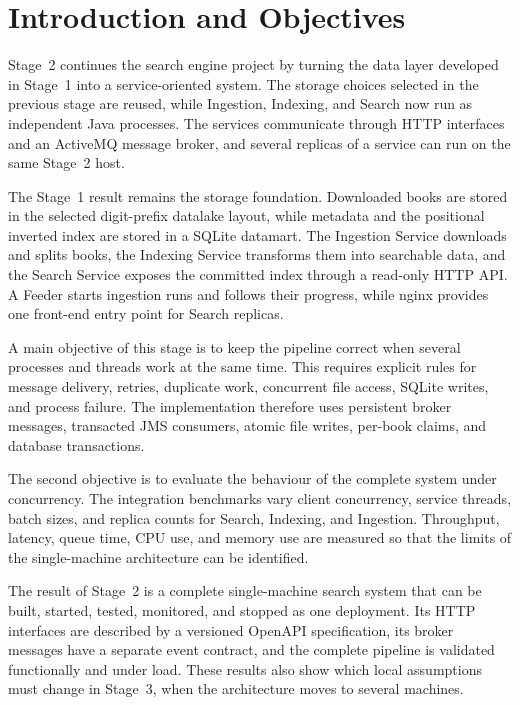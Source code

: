 \documentclass[12pt,a4paper]{article}
\begin{document}
\section{Introduction and Objectives}
Stage~2 continues the search engine project by turning the data layer developed in Stage~1 into a
service-oriented system. The storage choices selected in the previous stage are reused, while
Ingestion, Indexing, and Search now run as independent Java processes. The services communicate
through HTTP interfaces and an ActiveMQ message broker, and several replicas of a service can run
on the same Stage~2 host.

The Stage~1 result remains the storage foundation. Downloaded books are stored in the selected
digit-prefix datalake layout, while metadata and the positional inverted index are stored in a
SQLite datamart. The Ingestion Service downloads and splits books, the Indexing Service transforms
them into searchable data, and the Search Service exposes the committed index through a read-only
HTTP API. A Feeder starts ingestion runs and follows their progress, while nginx provides one
front-end entry point for Search replicas.

A main objective of this stage is to keep the pipeline correct when several processes and threads
work at the same time. This requires explicit rules for message delivery, retries, duplicate work,
concurrent file access, SQLite writes, and process failure. The implementation therefore uses
persistent broker messages, transacted JMS consumers, atomic file writes, per-book claims, and
database transactions.

The second objective is to evaluate the behaviour of the complete system under concurrency. The
integration benchmarks vary client concurrency, service threads, batch sizes, and replica counts
for Search, Indexing, and Ingestion. Throughput, latency, queue time, CPU use, and memory use are
measured so that the limits of the single-machine architecture can be identified.

The result of Stage~2 is a complete single-machine search system that can be built, started,
tested, monitored, and stopped as one deployment. Its HTTP interfaces are described by a versioned
OpenAPI specification, its broker messages have a separate event contract, and the complete
pipeline is validated functionally and under load. These results also show which local assumptions
must change in Stage~3, when the architecture moves to several machines.
\end{document}
